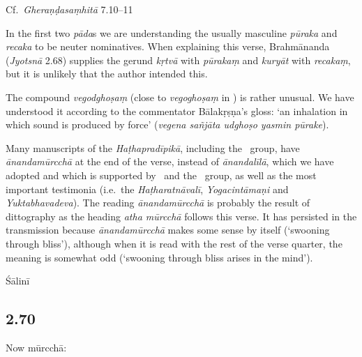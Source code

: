 \begin{ekdosis}
\begin{testimonia}[hp02_069]
Cf.~\emph{Gheraṇḍasaṃhitā} 7.10--11

\begin{versinnote}
\end{versinnote}
\end{testimonia}

\begin{philcomm}[hp02_069]
In the first two \emph{pāda}s we are understanding the usually masculine \emph{pūraka} and \emph{recaka} to be neuter nominatives. When explaining this verse, Brahmānanda (\emph{Jyotsnā} 2.68) supplies the gerund \emph{kṛtvā} with \emph{pūrakaṃ} and \emph{kuryāt} with \emph{recakaṃ}, but it is unlikely that the author intended this. 

The compound \emph{vegodghoṣaṃ} (close to \emph{vegoghoṣaṃ} in \alphaOne) is rather unusual. We have understood it according to the commentator Bālakṛṣṇa’s gloss: `an inhalation in which sound is produced by force' (\emph{vegena sañjāta udghoṣo yasmin pūrake}). 

Many manuscripts of the \emph{Haṭhapradīpikā}, including the \textalpha\ group, have \emph{ānandamūrcchā} at the end of the verse, instead of \emph{ānandalīlā}, which we have adopted and which is supported by \betaTwo\ and the \textgamma\ group, as well as the most important testimonia (i.e.~the \emph{Haṭharatnāvalī}, \emph{Yogacintāmaṇi} and \emph{Yuktabhavadeva}). The reading \emph{ānanda\-mūrcchā} is probably the result of dittography as the heading \emph{atha mūrcchā} follows this verse. It has persisted in the transmission because  \emph{ānandamūrcchā} makes some sense by itself (`swooning through bliss'), although when it is read with the rest of the verse quarter, the meaning is somewhat odd (`swooning through bliss arises in the mind').
\end{philcomm}

\begin{metre}[hp02_069]
Śālinī 
\end{metre}

\subsection*{2.70}
\begin{translation}[hp02_070]
Now mūrcchā:


\end{translation}
\end{ekdosis}
